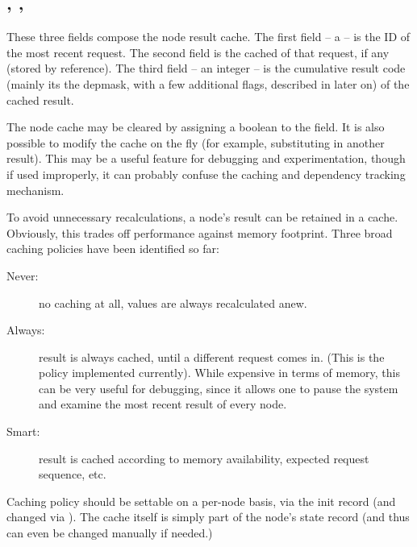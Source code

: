 \subsection{, , }
  
  These three fields compose the node result cache. The first field -- a
   -- is the ID of the most recent request. The second field is the
  cached  of that request, if any (stored by reference). The third
  field -- an integer -- is the cumulative result code (mainly its the depmask,
  with a few additional flags, described in  later on) of the
  cached result.

  The node cache may be cleared by assigning a boolean  to the
   field. It is also possible to modify the cache on the fly
  (for example, substituting in another result). This may be a useful feature
  for debugging and experimentation, though if used improperly, it can probably
  confuse the caching and dependency tracking mechanism.  



  To avoid unnecessary recalculations, a node's result can be retained in a
  cache. Obviously, this trades off performance against memory footprint. Three
  broad caching policies have been identified so far:

  \begin{description}
  
  \item[Never:] no caching at all, values are always recalculated anew. 
   
  \item[Always:] result is always cached, until a different request comes in.
    (This is the policy implemented currently). While expensive in terms of
    memory, this can be very useful for debugging, since it allows one to pause
    the system and examine the most recent result of every node.

  \item[Smart:] result is cached according to memory availability, expected
    request sequence, etc.

  \end{description}
  
  Caching policy should be settable on a per-node basis, via the init record
  (and changed via ). The cache itself is simply part of the
  node's state record (and thus can even be changed manually if needed.)
  
